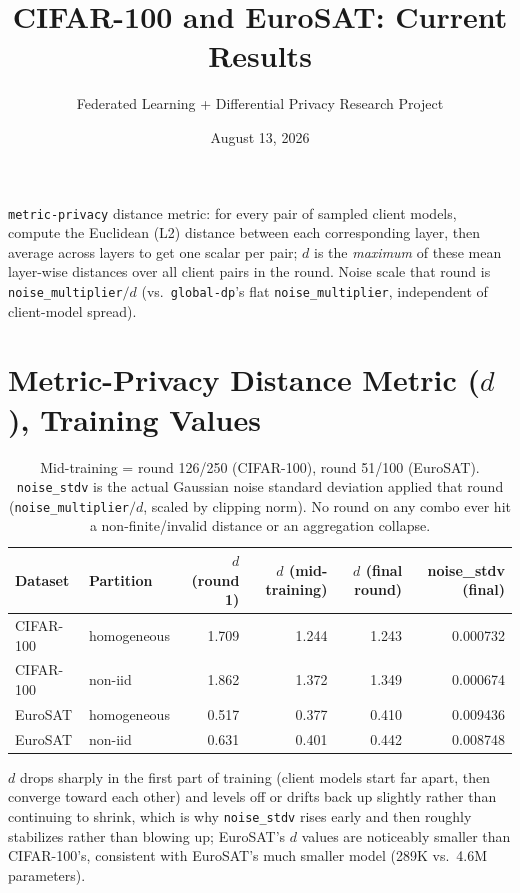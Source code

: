 \documentclass[11pt]{article}
\title{\textbf{CIFAR-100 and EuroSAT: Current Results}}
\author{Federated Learning + Differential Privacy Research Project}
\date{August 13, 2026}
\newcommand{\code}[1]{\texttt{#1}}
\begin{document}
\maketitle

\noindent
\code{metric-privacy} distance metric: for every pair of sampled client models, compute the
Euclidean (L2) distance between each corresponding layer, then average across layers to get one
scalar per pair; $d$ is the \emph{maximum} of these mean layer-wise distances over all client
pairs in the round. Noise scale that round is \code{noise\_multiplier}$/d$ (vs.\ \code{global-dp}'s
flat \code{noise\_multiplier}, independent of client-model spread).

\section*{Metric-Privacy Distance Metric ($d$), Training Values}

\begin{table}[h!]
\centering
\begin{tabular}{llrrrr}
\toprule
Dataset & Partition & $d$ (round 1) & $d$ (mid-training) & $d$ (final round) & noise\_stdv (final) \\
\midrule
CIFAR-100 & homogeneous & 1.709 & 1.244 & 1.243 & 0.000732 \\
CIFAR-100 & non-iid & 1.862 & 1.372 & 1.349 & 0.000674 \\
EuroSAT & homogeneous & 0.517 & 0.377 & 0.410 & 0.009436 \\
EuroSAT & non-iid & 0.631 & 0.401 & 0.442 & 0.008748 \\
\bottomrule
\end{tabular}
\caption*{Mid-training = round 126/250 (CIFAR-100), round 51/100 (EuroSAT). \code{noise\_stdv}
is the actual Gaussian noise standard deviation applied that round
(\code{noise\_multiplier}$/d$, scaled by clipping norm). No round on any combo ever hit a
non-finite/invalid distance or an aggregation collapse.}
\end{table}

\noindent
$d$ drops sharply in the first part of training (client models start far apart, then converge
toward each other) and levels off or drifts back up slightly rather than continuing to shrink,
which is why \code{noise\_stdv} rises early and then roughly stabilizes rather than blowing up;
EuroSAT's $d$ values are noticeably smaller than CIFAR-100's, consistent with EuroSAT's much
smaller model (289K vs.\ 4.6M parameters).
\end{document}
